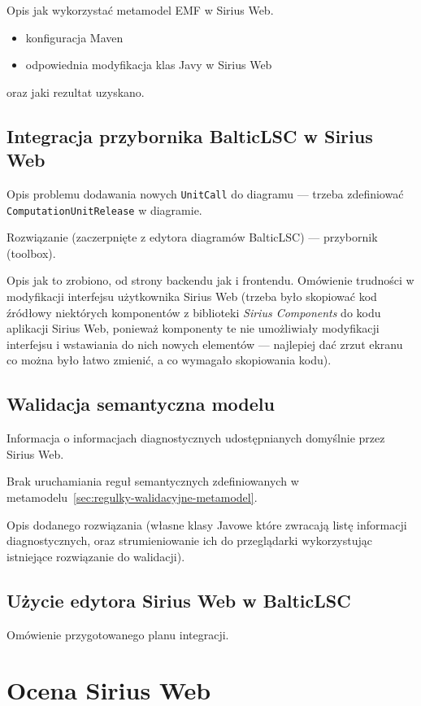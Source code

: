 Opis jak wykorzystać metamodel EMF w Sirius Web.

\begin{itemize}
	\item konfiguracja Maven
	\item odpowiednia modyfikacja klas Javy w Sirius Web
\end{itemize}

\noindent oraz jaki rezultat uzyskano.

\section{Integracja przybornika BalticLSC w Sirius Web}

Opis problemu dodawania nowych \texttt{UnitCall} do diagramu --- trzeba
zdefiniować \texttt{ComputationUnitRelease} w diagramie.

Rozwiązanie (zaczerpnięte z edytora diagramów BalticLSC) --- przybornik
(toolbox).

Opis jak to zrobiono, od strony backendu jak i frontendu. Omówienie trudności w
modyfikacji interfejsu użytkownika Sirius Web (trzeba było skopiować kod
źródłowy niektórych komponentów z biblioteki \textit{Sirius Components} do kodu
aplikacji Sirius Web, ponieważ komponenty te nie umożliwiały modyfikacji
interfejsu i wstawiania do nich nowych elementów --- najlepiej dać zrzut ekranu
co można było łatwo zmienić, a co wymagało skopiowania kodu).

\section{Walidacja semantyczna modelu}

Informacja o informacjach diagnostycznych udostępnianych domyślnie przez Sirius
Web.

Brak uruchamiania reguł semantycznych zdefiniowanych w
metamodelu~\ref{sec:regulky-walidacyjne-metamodel}.

Opis dodanego rozwiązania (własne klasy Javowe które zwracają listę informacji
diagnostycznych, oraz strumieniowanie ich do przeglądarki wykorzystując
istniejące rozwiązanie do walidacji).

\section{Użycie edytora Sirius Web w BalticLSC}

Omówienie przygotowanego planu integracji.

\chapter{Ocena Sirius Web}

